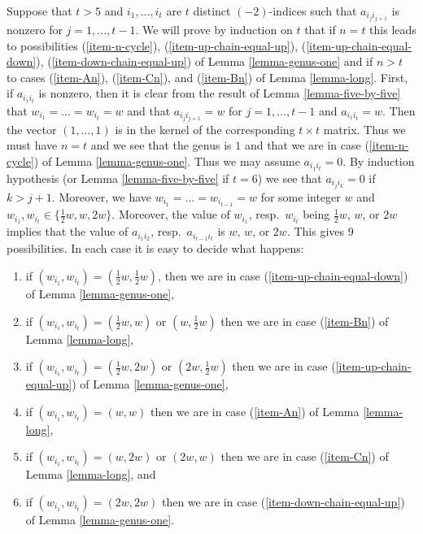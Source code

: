 \documentclass{stacks-project}
\theoremstyle{plain}
\theoremstyle{definition}
\theoremstyle{remark}
\numberwithin{equation}{subsection}
\begin{document}
\noindent
Suppose that $t > 5$ and $i_1, \ldots, i_t$ are $t$ distinct $(-2)$-indices
such that $a_{i_ji_{j + 1}}$ is nonzero for $j = 1, \ldots, t - 1$. We will
prove by induction on $t$ that if $n = t$ this leads to possibilities
(\ref{item-n-cycle}), (\ref{item-up-chain-equal-up}),
(\ref{item-up-chain-equal-down}), (\ref{item-down-chain-equal-up})
of Lemma \ref{lemma-genus-one} and if $n > t$ to cases
(\ref{item-An}), (\ref{item-Cn}), and (\ref{item-Bn}) of
Lemma \ref{lemma-long}.
First, if $a_{i_1i_t}$ is nonzero, then it is clear from
the result of Lemma \ref{lemma-five-by-five} that
$w_{i_1} = \ldots = w_{i_t} = w$ and that
$a_{i_ji_{j + 1}} = w$ for $j = 1, \ldots, t - 1$ and
$a_{i_1i_t} = w$. Then the vector $(1, \ldots, 1)$ is in the kernel
of the corresponding $t \times t$ matrix. Thus we must have $n = t$
and we see that the genus is $1$ and that we are
in case (\ref{item-n-cycle}) of Lemma \ref{lemma-genus-one}.
Thus we may assume $a_{i_1i_t} = 0$.
By induction hypothesis (or Lemma \ref{lemma-five-by-five} if $t = 6$)
we see that $a_{i_ji_k} = 0$ if $k > j + 1$.
Moreover, we have $w_{i_1} = \ldots = w_{i_{t - 1}} = w$
for some integer $w$ and $w_{i_1}, w_{i_t} \in \{\frac{1}{2}w, w, 2w\}$.
Moreover, the value of $w_{i_1}$, resp.\ $w_{i_t}$ being
$\frac{1}{2}w$, $w$, or $2w$ implies that the
value of $a_{i_1i_2}$, resp.\ $a_{i_{t - 1}i_t}$
is $w$, $w$, or $2w$. This gives $9$ possibilities.
In each case it is easy to decide what happens:
\begin{enumerate}
\item if $(w_{i_1}, w_{i_t}) = (\frac{1}{2}w, \frac{1}{2}w)$, then
we are in case (\ref{item-up-chain-equal-down}) of
Lemma \ref{lemma-genus-one},
\item if $(w_{i_1}, w_{i_t}) = (\frac{1}{2}w, w)$ or $(w, \frac{1}{2}w)$
then we are in case (\ref{item-Bn}) of Lemma \ref{lemma-long},
\item if $(w_{i_1}, w_{i_t}) = (\frac{1}{2}w, 2w)$ or $(2w, \frac{1}{2}w)$
then we are in case (\ref{item-up-chain-equal-up}) of
Lemma \ref{lemma-genus-one},
\item if $(w_{i_1}, w_{i_t}) = (w, w)$ then we are in case
(\ref{item-An}) of Lemma \ref{lemma-long},
\item if $(w_{i_1}, w_{i_t}) = (w, 2w)$ or $(2w, w)$ then we are
in case (\ref{item-Cn}) of Lemma \ref{lemma-long}, and
\item if $(w_{i_1}, w_{i_t}) = (2w, 2w)$ then we are in case
(\ref{item-down-chain-equal-up}) of Lemma \ref{lemma-genus-one}.
\end{enumerate}
\end{document}
